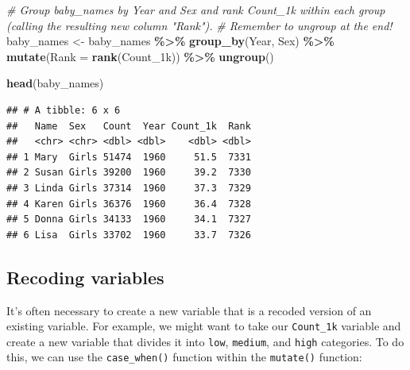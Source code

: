 \documentclass[
]{book}
\newenvironment{Shaded}{\begin{snugshade}}{\end{snugshade}}
\newcommand{\CommentTok}[1]{\textcolor[rgb]{0.56,0.35,0.01}{\textit{#1}}}
\newcommand{\DataTypeTok}[1]{\textcolor[rgb]{0.13,0.29,0.53}{#1}}
\newcommand{\KeywordTok}[1]{\textcolor[rgb]{0.13,0.29,0.53}{\textbf{#1}}}
\newcommand{\NormalTok}[1]{#1}
\newcommand{\OperatorTok}[1]{\textcolor[rgb]{0.81,0.36,0.00}{\textbf{#1}}}
\newcommand{\StringTok}[1]{\textcolor[rgb]{0.31,0.60,0.02}{#1}}
\begin{document}
\begin{Shaded}
\begin{Highlighting}[]
\CommentTok{\# Group baby\_names by Year and Sex and rank Count\_1k within each group (calling the resulting new column "Rank"). }
\CommentTok{\# Remember to ungroup at the end!}
\NormalTok{baby\_names \textless{}{-}}
\StringTok{  }\NormalTok{baby\_names }\OperatorTok{\%\textgreater{}\%}
\StringTok{  }\KeywordTok{group\_by}\NormalTok{(Year, Sex) }\OperatorTok{\%\textgreater{}\%}
\StringTok{  }\KeywordTok{mutate}\NormalTok{(}\DataTypeTok{Rank =} \KeywordTok{rank}\NormalTok{(Count\_1k)) }\OperatorTok{\%\textgreater{}\%}
\StringTok{  }\KeywordTok{ungroup}\NormalTok{()}

\KeywordTok{head}\NormalTok{(baby\_names)}
\end{Highlighting}
\end{Shaded}

\begin{verbatim}
## # A tibble: 6 x 6
##   Name  Sex   Count  Year Count_1k  Rank
##   <chr> <chr> <dbl> <dbl>    <dbl> <dbl>
## 1 Mary  Girls 51474  1960     51.5  7331
## 2 Susan Girls 39200  1960     39.2  7330
## 3 Linda Girls 37314  1960     37.3  7329
## 4 Karen Girls 36376  1960     36.4  7328
## 5 Donna Girls 34133  1960     34.1  7327
## 6 Lisa  Girls 33702  1960     33.7  7326
\end{verbatim}

\hypertarget{recoding-variables}{%
\subsection{Recoding variables}\label{recoding-variables}}

It's often necessary to create a new variable that is a recoded version of an existing variable.
For example, we might want to take our \texttt{Count\_1k} variable and create a new variable that divides
it into \texttt{low}, \texttt{medium}, and \texttt{high} categories. To do this, we can use the \texttt{case\_when()}
function within the \texttt{mutate()} function:
\end{document}
